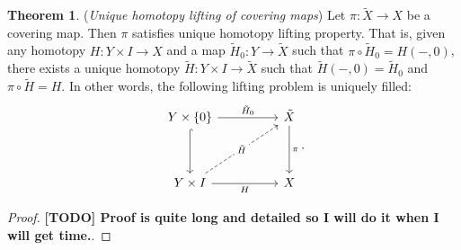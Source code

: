 \documentclass[letterpaper,11pt,twoside]{article}
\theoremstyle{definition}
\theoremstyle{definition}
\newtheorem{theorem}[proposition]{Theorem}
\theoremstyle{definition}
\theoremstyle{definition}
\theoremstyle{definition}
\theoremstyle{definition}
\theoremstyle{remark}
\theoremstyle{definition}
\begin{document}
\begin{theorem}\label{T-5.2.3}
(\textit{Unique homotopy lifting of covering maps}) Let $\pi : \tilde{X} \to X$ be a covering map. Then $\pi$ satisfies unique homotopy lifting property. That is, given any homotopy $H : Y\times I \to X$ and a map $\tilde{H}_0 : Y\to \tilde{X}$ such that $\pi \circ \tilde{H}_0 = H(-,0)$, there exists a unique homotopy $\tilde{H} : Y\times I \to \tilde{X}$ such that $\tilde{H}(-,0) = \tilde{H}_0$ and $\pi \circ \tilde{H} = H$. In other words, the following lifting problem is uniquely filled:
\[\begin{tikzcd}
	{Y\times \{0\}} && {\tilde{X}} \\
	\\
	{Y\times I} && X
	\arrow["\pi", from=1-3, to=3-3]
	\arrow["H"', from=3-1, to=3-3]
	\arrow[hook, from=1-1, to=3-1]
	\arrow["{\tilde{H}_0}", from=1-1, to=1-3]
	\arrow["{\tilde{H}}"{description}, dashed, from=3-1, to=1-3]
\end{tikzcd}.\]
\end{theorem}
\begin{proof}
\textbf{[TODO] Proof is quite long and detailed so I will do it when I will get time.}.
\end{proof}
\end{document}
